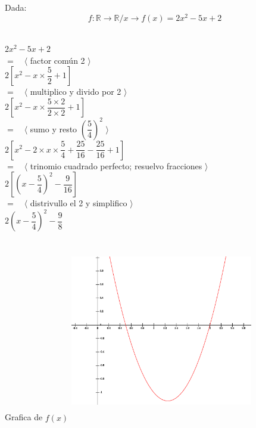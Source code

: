 Dada:
$$ f : \mathbb{R} \longrightarrow \mathbb{R} / x \longrightarrow f(x) = 2x^2-5x+2$$\\
\hfill
\begin{minipage}{.45\textwidth}
\begin{center}
$2x^2-5x+2 $\\
$= \quad \langle$ factor común 2 $\rangle$\\
$ 2 \left[ x^2 - x \times \dfrac{5}{2}  +1 \right] $\\
$= \quad \langle$ multiplico y divido por 2 $\rangle$\\
$ 2 \left[ x^2 - x \times \dfrac{5\times 2}{2\times 2}  +1 \right] $\\
$= \quad \langle$ sumo y resto $\left(\dfrac{5}{4}\right)^2$ $\rangle$\\
$ 2 \left[ x^2 - 2 \times x \times \dfrac{5}{4} + \dfrac{25}{16} -\dfrac{25}{16}  +1 \right] $\\
$= \quad \langle$ trinomio cuadrado perfecto; resuelvo fracciones $\rangle$\\
$ 2 \left[ \left(x-\dfrac{5}{4} \right)^2 - \dfrac{9}{16} \right] $\\
$= \quad \langle$ distrivullo el 2  y simplifico $\rangle$\\
$ 2 \left(x-\dfrac{5}{4} \right)^2 - \dfrac{9}{8} $\\
\end{center}
\end{minipage}
\hfill
\begin{minipage}{.45\textwidth}
\begin{center}

Grafica de $f(x)$
\includegraphics[height=8cm,width=8cm]{fejxx.eps} 
\end{center}
\end{minipage}
\hfill \\ \\


